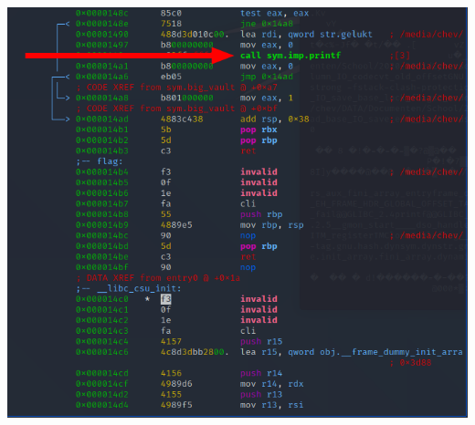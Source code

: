 \documentclass[../main.tex]{subfiles}
\begin{document}
\includegraphics[width=\linewidth]{images/Nicolai/lab_assembly_print.png}
\end{document}

